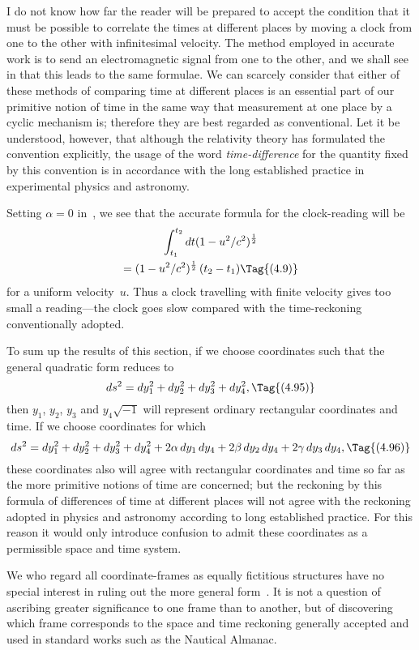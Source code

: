 \documentclass[12pt]{book}
\begin{document}
I do not know how far the reader will be prepared to accept the condition
that it must be possible to correlate the times at different places by moving
a clock from one to the other with infinitesimal velocity. The method
employed in accurate work is to send an electromagnetic signal from one to
the other, and we shall see in  that this leads to the same formulae. We
can scarcely consider that either of these methods of comparing time at
different places is an essential part of our primitive notion of time in the
same way that measurement at one place by a cyclic mechanism is; therefore
they are best regarded as conventional. Let it be understood, however, that
although the relativity theory has formulated the convention explicitly, the
usage of the word \emph{time-difference} for the quantity fixed by this convention is
%
in accordance with the long established practice in experimental physics and
astronomy.

Setting $\alpha = 0$ in~, we see that the accurate formula for the clock-reading
will be
\begin{gather*}
  \int_{t_{1}}^{t_{2}} dt (1 - u^{2}/c^{2})^{\frac{1}{2}} \\
  = (1 - u^{2}/c^{2})^{\frac{1}{2}}\, (t_{2} - t_{1})
  \Tag{(4.9)}
\end{gather*}
for a uniform velocity~$u$. Thus a clock travelling with finite velocity gives
too small a reading---the clock goes slow compared with the time-reckoning
conventionally adopted.

To sum up the results of this section, if we choose coordinates such that
the general quadratic form reduces to
\[
ds^{2} = dy_{1}^{2} + dy_{2}^{2} + dy_{3}^{2} + dy_{4}^{2},
\Tag{(4.95)}
\]
then $y_{1}$, $y_{2}$, $y_{3}$ and $y_{4} \sqrt{-1}$ will represent ordinary rectangular coordinates and
time. If we choose coordinates for which
\[
  ds^{2} = dy_{1}^{2} + dy_{2}^{2} + dy_{3}^{2} + dy_{4}^{2}
  + 2\alpha\, dy_{1}\, dy_{4} + 2\beta\, dy_{2}\, dy_{4} + 2\gamma\, dy_{3}\, dy_{4},
\Tag{(4.96)}
\]
these coordinates also will agree with rectangular coordinates and time so far
as the more primitive notions of time are concerned; but the reckoning by
this formula of differences of time at different places will not agree with the
reckoning adopted in physics and astronomy according to long established
practice. For this reason it would only introduce confusion to admit these
coordinates as a permissible space and time system.

We who regard all coordinate-frames as equally fictitious structures have
no special interest in ruling out the more general form~. It is not a
question of ascribing greater significance to one frame than to another, but
of discovering which frame corresponds to the space and time reckoning
generally accepted and used in standard works such as the Nautical Almanac.
\end{document}
